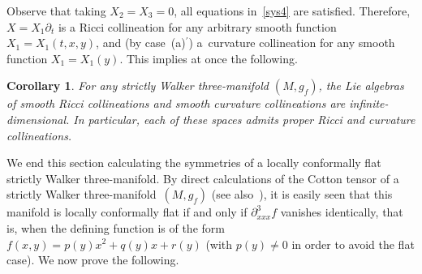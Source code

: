 \documentclass[pdftex]{sigma}
\numberwithin{equation}{section}
\newtheorem{Corollary}[Theorem]{Corollary}
 { \theoremstyle{definition}
\newtheorem{Remark}[Theorem]{Remark} }
\begin{document}
Observe that taking $X_2=X_3=0$, all equations in~\eqref{sys4} are satisf\/ied. Therefore, $X=X_1 \partial_{t}$ is a Ricci collineation for any arbitrary smooth function $X_1=X_1(t,x,y)$, and (by case~(a)$^\prime$) a~curvature collineation for any smooth function $X_1=X_1(y)$. This implies at once the following.

\begin{Corollary}
For any strictly Walker three-manifold $(M,g_f)$, the Lie algebras of smooth Ricci collineations and smooth curvature collineations are infinite-dimensional. In particular, each of these spaces admits proper Ricci and curvature collineations.
\end{Corollary}

We end this section calculating the symmetries of a locally conformally f\/lat strictly Walker three-manifold. By direct calculations of the Cotton tensor of a strictly Walker three-mani\-fold~$(M,g_f)$ (see also~\cite{ChGRVA}), it is easily seen that this manifold is locally conformally f\/lat if and only if $\partial_{xxx}^3f$ vanishes identically, that is, when the def\/ining function is of the form $f(x,y)=p(y)x^2+q(y)x+r(y)$ (with $p(y) \neq 0$ in order to avoid the f\/lat case). We now prove the following.
\end{document}

